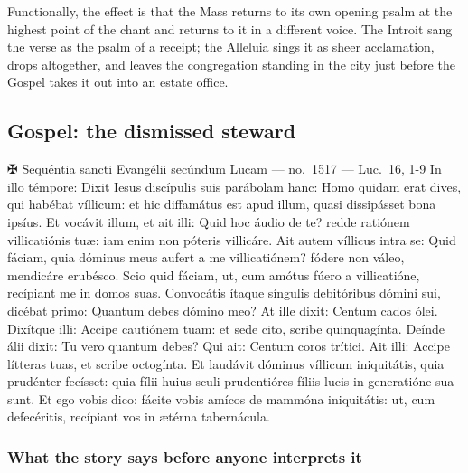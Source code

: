 Functionally, the effect is that the Mass returns to its own opening psalm at
the highest point of the chant and returns to it in a different voice. The
Introit sang the verse as the psalm of a receipt; the Alleluia sings it as
sheer acclamation, drops  altogether, and leaves the
congregation standing in the city just before the Gospel takes it out into an
estate office.

\subsection{Gospel: the dismissed steward }

\begin{appointed}{✠ Sequéntia sancti Evangélii secúndum Lucam --- no.\ 1517 --- Luc.\ 16, 1-9}
In illo témpore: Dixit Iesus discípulis suis parábolam hanc: Homo quidam erat
dives, qui habébat víllicum: et hic diffamátus est apud illum, quasi dissipásset
bona ipsíus. Et vocávit illum, et ait illi: Quid hoc áudio de te? redde
ratiónem villicatiónis tu\ae: iam enim non póteris villicáre. Ait autem
víllicus intra se: Quid fáciam, quia dóminus meus aufert a me villicatiónem?
fódere non váleo, mendicáre erubésco. Scio quid fáciam, ut, cum amótus fúero a
villicatióne, recípiant me in domos suas. Convocátis ítaque síngulis debitóribus
dómini sui, dicébat primo: Quantum debes dómino meo? At ille dixit: Centum
cados ólei. Dixítque illi: Accipe cautiónem tuam: et sede cito, scribe
quinquagínta. Deínde álii dixit: Tu vero quantum debes? Qui ait: Centum coros
trítici. Ait illi: Accipe lítteras tuas, et scribe octogínta. Et laudávit
dóminus víllicum iniquitátis, quia prudénter fecísset: quia fílii huius
s\aeacute culi prudentióres fíliis lucis in generatióne sua sunt. Et ego vobis
dico: fácite vobis amícos de mammóna iniquitátis: ut, cum defecéritis, recípiant
vos in ætérna tabernácula.
\end{appointed}

\subsubsection*{What the story says before anyone interprets it}

